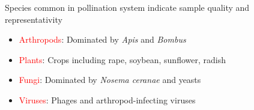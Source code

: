 \documentclass{beamer}
\begin{document}
\begin{frame}{Species common in pollination system indicate sample quality and representativity}
    \begin{itemize}
        \item \textcolor{red}{Arthropods}:
        \newline Dominated by \textit{Apis} and \textit{Bombus}
        \item \textcolor{red}{Plants}:
        \newline Crops including rape, soybean, sunflower, radish
        \item \textcolor{red}{Fungi}:
        \newline Dominated by \textit{Nosema ceranae} and yeasts
        \item \textcolor{red}{Viruses}:
        \newline Phages and arthropod-infecting viruses
    \end{itemize}
\end{frame}



\end{document}
